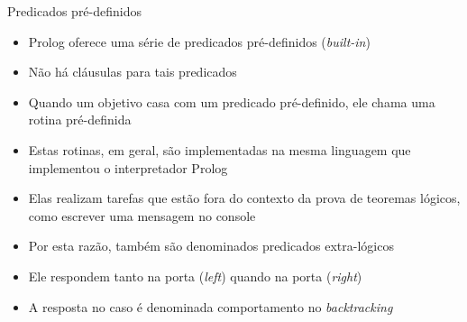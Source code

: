\begin{frame}[fragile]{Predicados pré-definidos}

    \begin{itemize}
        \item Prolog oferece uma série de predicados pré-definidos (\textit{built-in})

        \item Não há cláusulas para tais predicados

        \item Quando um objetivo casa com um predicado pré-definido, ele chama uma rotina 
            pré-definida

        \item Estas rotinas, em geral, são implementadas na mesma linguagem que implementou o 
            interpretador Prolog 

        \item Elas realizam tarefas que estão fora do contexto da prova de teoremas lógicos, 
            como escrever uma mensagem no console 

        \item Por esta razão, também são denominados predicados extra-lógicos 

        \item Ele respondem tanto na porta  (\textit{left}) quando na 
            porta  (\textit{right})

        \item A resposta no caso  é denominada comportamento no 
            \textit{backtracking}

    \end{itemize}

\end{frame}

